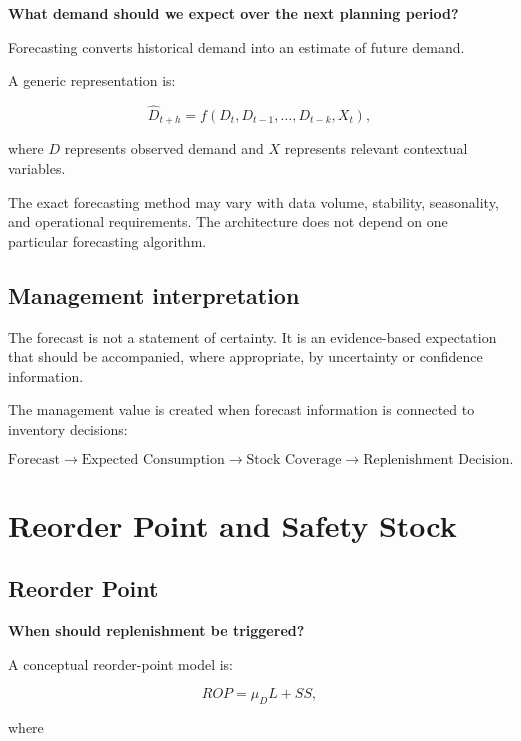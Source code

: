 \documentclass[11pt,a4paper]{article}
\begin{document}
\begin{principle}[Question]
\centering
\Large \textbf{What demand should we expect over the next planning period?}
\end{principle}

Forecasting converts historical demand into an estimate of future demand.

A generic representation is:

\[
\widehat{D}_{t+h}
=
f(D_t,D_{t-1},\ldots,D_{t-k},X_t),
\]

where \(D\) represents observed demand and \(X\) represents relevant contextual
variables.

The exact forecasting method may vary with data volume, stability, seasonality,
and operational requirements. The architecture does not depend on one
particular forecasting algorithm.

\subsection{Management interpretation}

The forecast is not a statement of certainty. It is an evidence-based
expectation that should be accompanied, where appropriate, by uncertainty or
confidence information.

The management value is created when forecast information is connected to
inventory decisions:

\[
\text{Forecast}
\rightarrow
\text{Expected Consumption}
\rightarrow
\text{Stock Coverage}
\rightarrow
\text{Replenishment Decision}.
\]

\section{Reorder Point and Safety Stock}

\subsection{Reorder Point}

\begin{principle}[Question]
\centering
\Large \textbf{When should replenishment be triggered?}
\end{principle}

A conceptual reorder-point model is:

\[
ROP = \mu_D L + SS,
\]

where
\end{document}
